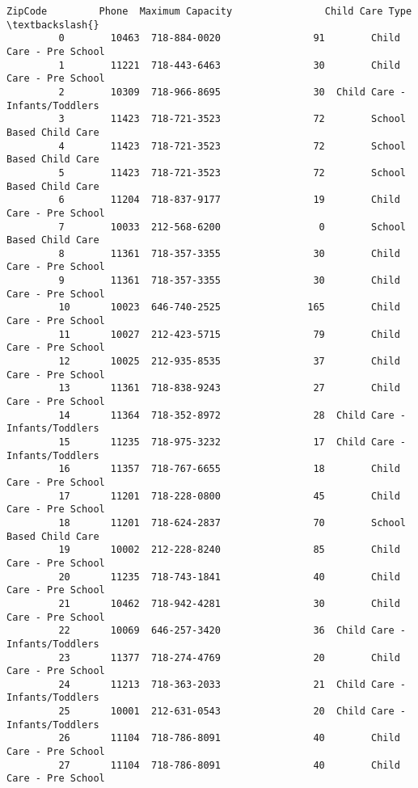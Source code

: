 \documentclass[11pt]{article}
\begin{document}
\begin{Verbatim}[commandchars=\\\{\}]
                ZipCode         Phone  Maximum Capacity                Child Care Type  \textbackslash{}
         0        10463  718-884-0020                91        Child Care - Pre School   
         1        11221  718-443-6463                30        Child Care - Pre School   
         2        10309  718-966-8695                30  Child Care - Infants/Toddlers   
         3        11423  718-721-3523                72        School Based Child Care   
         4        11423  718-721-3523                72        School Based Child Care   
         5        11423  718-721-3523                72        School Based Child Care   
         6        11204  718-837-9177                19        Child Care - Pre School   
         7        10033  212-568-6200                 0        School Based Child Care   
         8        11361  718-357-3355                30        Child Care - Pre School   
         9        11361  718-357-3355                30        Child Care - Pre School   
         10       10023  646-740-2525               165        Child Care - Pre School   
         11       10027  212-423-5715                79        Child Care - Pre School   
         12       10025  212-935-8535                37        Child Care - Pre School   
         13       11361  718-838-9243                27        Child Care - Pre School   
         14       11364  718-352-8972                28  Child Care - Infants/Toddlers   
         15       11235  718-975-3232                17  Child Care - Infants/Toddlers   
         16       11357  718-767-6655                18        Child Care - Pre School   
         17       11201  718-228-0800                45        Child Care - Pre School   
         18       11201  718-624-2837                70        School Based Child Care   
         19       10002  212-228-8240                85        Child Care - Pre School   
         20       11235  718-743-1841                40        Child Care - Pre School   
         21       10462  718-942-4281                30        Child Care - Pre School   
         22       10069  646-257-3420                36  Child Care - Infants/Toddlers   
         23       11377  718-274-4769                20        Child Care - Pre School   
         24       11213  718-363-2033                21  Child Care - Infants/Toddlers   
         25       10001  212-631-0543                20  Child Care - Infants/Toddlers   
         26       11104  718-786-8091                40        Child Care - Pre School   
         27       11104  718-786-8091                40        Child Care - Pre School   

\end{Verbatim}
\end{document}
